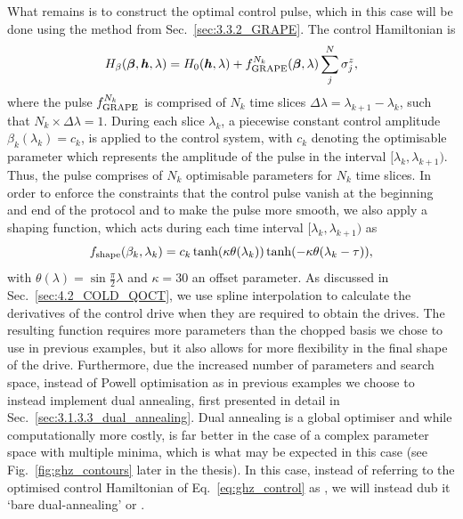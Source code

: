 What remains is to construct the optimal control pulse, which in this case will be done using the  method from Sec.~\ref{sec:3.3.2_GRAPE}. The control Hamiltonian is
\begin{equation}\label{eq:ghz_control}
    H_{\beta}(\boldsymbol{\beta}, \boldsymbol{h}, \lambda) = H_0(\boldsymbol{h}, \lambda) + f^{N_k}_{\rm GRAPE}(\boldsymbol{\beta}, \lambda) \sum_j^N \sigma^z_j,
\end{equation}
where the pulse $f^{N_k}_{\rm GRAPE}$ is comprised of $N_k$ time slices $\Delta \lambda = \lambda_{k+1} - \lambda_k$, such that $N_k \times \Delta \lambda = 1$. During each slice $\lambda_k$, a piecewise constant control amplitude $\beta_k(\lambda_k) = c_k$, is applied to the control system, with $c_k$ denoting the optimisable parameter which represents the amplitude of the pulse in the interval $[\lambda_k, \lambda_{k+1})$. Thus, the pulse comprises of $N_k$ optimisable parameters for $N_k$ time slices. In order to enforce the constraints that the control pulse vanish at the beginning and end of the protocol and to make the pulse more smooth, we also apply a shaping function, which acts during each time interval $[\lambda_k, \lambda_{k+1})$ as
\begin{equation}
        f_{\rm shape}(\beta_k, \lambda_k) = c_k \tanh (\kappa \theta(\lambda_k)) \tanh (- \kappa \theta(\lambda_k - \tau)),
\end{equation}
with $\theta(\lambda) = \sin \frac{\pi}{2} \lambda$ and $\kappa = 30$ an offset parameter. As discussed in Sec.~\ref{sec:4.2_COLD_QOCT}, we use spline interpolation to calculate the derivatives of the control drive when they are required to obtain the  drives. The resulting function requires more parameters than the chopped basis we chose to use in previous examples, but it also allows for more flexibility in the final shape of the drive. Furthermore, due the increased number of parameters and search space, instead of Powell optimisation as in previous examples we choose to instead implement dual annealing, first presented in detail in Sec.~\ref{sec:3.1.3.3_dual_annealing}. Dual annealing is a global optimiser and while computationally more costly, is far better in the case of a complex parameter space with multiple minima, which is what may be expected in this case (see Fig.~\ref{fig:ghz_contours} later in the thesis). In this case, instead of referring to the optimised control Hamiltonian of Eq.~\eqref{eq:ghz_control} as , we will instead dub it `bare dual-annealing' or . 


